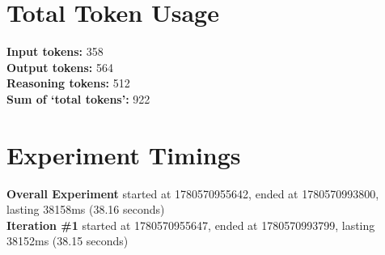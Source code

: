\documentclass{article}
\begin{document}
\section*{Total Token Usage}
\textbf{Input tokens: }358
\\\textbf{Output tokens: }564
\\\textbf{Reasoning tokens: }512
\\\textbf{Sum of `total tokens': }922
\section*{Experiment Timings}
\textbf{Overall Experiment} started at 1780570955642, ended at 1780570993800, lasting 38158ms (38.16 seconds)
\\\textbf{Iteration \#1} started at 1780570955647, ended at 1780570993799, lasting 38152ms (38.15 seconds)
\end{document}
